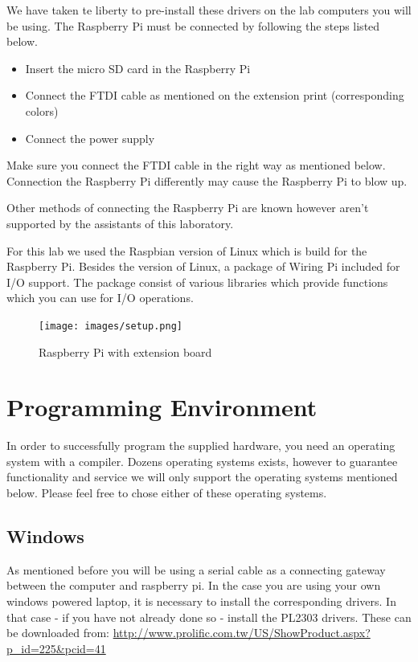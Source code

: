 We have taken te liberty to pre-install these drivers on the lab computers you will be using. The Raspberry Pi must be connected by following the steps listed below. 

\begin{itemize}
    \item Insert the micro SD card in the Raspberry Pi
    \item Connect the FTDI cable as mentioned on the extension print (corresponding colors)
    \item Connect the power supply
\end{itemize}

\begin{warning}
Make sure you connect the FTDI cable in the right way as mentioned below. Connection the Raspberry Pi differently may cause the Raspberry Pi to blow up. 
\end{warning}

Other methods of connecting the Raspberry Pi are known however aren't supported by the assistants of this laboratory. 

For this lab we used the Raspbian version of Linux which is build for the Raspberry Pi. Besides the version of Linux, a package of Wiring Pi included for I/O support. The package consist of various libraries which provide functions which you can use for I/O operations.

\begin{figure}[!htbp]
	\centering
		\texttt{[image: images/setup.png]}
	\caption{Raspberry Pi with extension board}
	\label{fig:raspberry-setup}
\end{figure}


\section{Programming Environment}
\label{sec:environment}
In order to successfully program the supplied hardware, you need an operating system with a compiler. Dozens operating systems exists, however to guarantee functionality and service we will only support the operating systems mentioned below. Please feel free to chose either of these operating systems.

\subsection*{Windows}
As mentioned before you will be using a serial cable as a connecting gateway between the computer and raspberry pi. In the case you are using your own windows powered laptop, it is necessary to install the corresponding drivers. In that case - if you have not already done so - install the PL2303 drivers. These can be downloaded from: \url{http://www.prolific.com.tw/US/ShowProduct.aspx?p_id=225&pcid=41}\\


